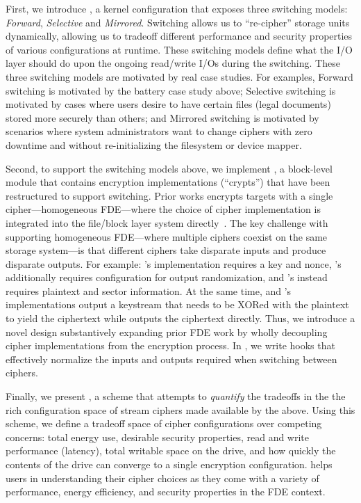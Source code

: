 First, we introduce \sysA, a kernel configuration that exposes three switching
models: {\em Forward}, {\em Selective} and {\em Mirrored}. Switching allows us
to ``re-cipher'' storage units dynamically, allowing us to tradeoff different
performance and security properties of various configurations at runtime. These
switching models define what the I/O layer should do upon the ongoing read/write
I/Os during the switching. These three switching models are motivated by real
case studies. For examples, Forward switching is motivated by the battery case
study above; Selective switching is motivated by cases where users desire to
have certain files (\eg legal documents) stored more securely than others; and
Mirrored switching is motivated by scenarios where system administrators want to
change ciphers with zero downtime and without re-initializing the filesystem or
device mapper.

Second, to support the switching models above, we implement \sysB, a block-level
module that contains encryption implementations (``crypts'') that have been
restructured to support switching. Prior works encrypts targets with a single
cipher---\ie homogeneous FDE---where the choice of cipher implementation is
integrated into the file/block layer system directly~\cite{StrongBox, dmcrypt}.
The key challenge with supporting homogeneous FDE---where multiple ciphers
coexist on the same storage system---is that different ciphers take disparate
inputs and produce disparate outputs. For example: \encB's implementation
requires a key and nonce, \encA's additionally requires configuration for output
randomization, and \encC's instead requires plaintext and sector information. At
the same time, \encA and \encB's implementations output a keystream that needs
to be XORed with the plaintext to yield the ciphertext while \encC outputs the
ciphertext directly. Thus, we introduce a novel design substantively expanding
prior FDE work by wholly decoupling cipher implementations from the encryption
process. In \sysB, we write hooks that effectively normalize the inputs and
outputs required when switching between ciphers.

Finally, we present \sysC, a scheme that attempts to {\em quantify} the
tradeoffs in the the rich configuration space of stream ciphers made available
by the above. Using this scheme, we define a tradeoff space of cipher
configurations over competing concerns: total energy use, desirable security
properties, read and write performance (latency), total writable space on the
drive, and how quickly the contents of the drive can converge to a single
encryption configuration. \sysC helps users in understanding their cipher
choices as they come with a variety of performance, energy efficiency, and
security properties in the FDE context.

